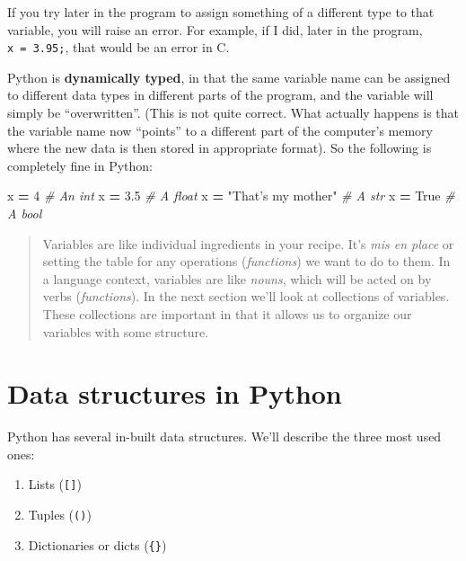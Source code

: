 \documentclass[
  letterpaper,
]{scrbook}
\newenvironment{Shaded}{\begin{snugshade}}{\end{snugshade}}
\newcommand{\CommentTok}[1]{\textcolor[rgb]{0.56,0.35,0.01}{\textit{#1}}}
\newcommand{\DecValTok}[1]{\textcolor[rgb]{0.00,0.00,0.81}{#1}}
\newcommand{\FloatTok}[1]{\textcolor[rgb]{0.00,0.00,0.81}{#1}}
\newcommand{\NormalTok}[1]{#1}
\newcommand{\OperatorTok}[1]{\textcolor[rgb]{0.81,0.36,0.00}{\textbf{#1}}}
\newcommand{\StringTok}[1]{\textcolor[rgb]{0.31,0.60,0.02}{#1}}
\newcommand{\VariableTok}[1]{\textcolor[rgb]{0.00,0.00,0.00}{#1}}
\providecommand{\tightlist}{%
  \setlength{\itemsep}{0pt}\setlength{\parskip}{0pt}}
\begin{document}
If you try later in the program to assign something of a different type to that variable, you will raise an error. For example, if I did, later in the program, \texttt{x\ =\ 3.95;}, that would be an error in C.

Python is \textbf{dynamically typed}, in that the same variable name can be assigned to different data types in different parts of the program, and the variable will simply be ``overwritten''. (This is not quite correct. What actually happens is that the variable name now ``points'' to a different part of the computer's memory where the new data is then stored in appropriate format). So the following is completely fine in Python:

\begin{Shaded}
\begin{Highlighting}[]
\NormalTok{x }\OperatorTok{=} \DecValTok{4}  \CommentTok{# An int}
\NormalTok{x }\OperatorTok{=} \FloatTok{3.5}  \CommentTok{# A float}
\NormalTok{x }\OperatorTok{=} \StringTok{"That's my mother"}  \CommentTok{# A str}
\NormalTok{x }\OperatorTok{=} \VariableTok{True}  \CommentTok{# A bool}
\end{Highlighting}
\end{Shaded}

\begin{quote}
Variables are like individual ingredients in your recipe. It's \emph{mis en place} or setting the table for any operations (\emph{functions}) we want to do to them. In a language context, variables are like \emph{nouns}, which will be acted on by verbs (\emph{functions}). In the next section we'll look at collections of variables. These collections are important in that it allows us to organize our variables with some structure.
\end{quote}

\hypertarget{data-structures-in-python}{%
\section{Data structures in Python}\label{data-structures-in-python}}

Python has several in-built data structures. We'll describe the three most used ones:

\begin{enumerate}
\def\labelenumi{\arabic{enumi}.}
\tightlist
\item
  Lists (\texttt{{[}{]}})
\item
  Tuples (\texttt{()})
\item
  Dictionaries or dicts (\texttt{\{\}})
\end{enumerate}
\end{document}

